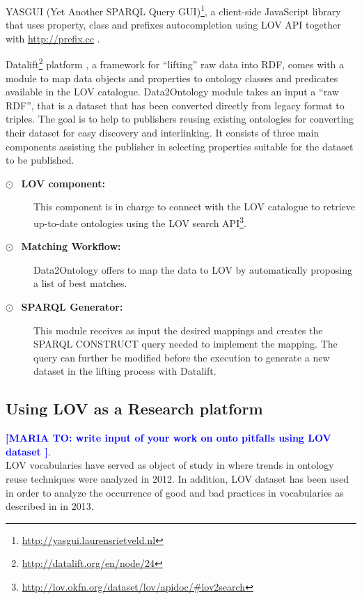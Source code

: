 \documentclass{iosart2c}
\newcommand{\maria}[1]{\textcolor{blue}{\textbf{[MARIA TO:#1]}}}
\begin{document}
YASGUI (Yet Another SPARQL Query GUI)\footnote{\url{http://yasgui.laurensrietveld.nl}}, a client-side JavaScript library that uses property, class and prefixes autocompletion using LOV API together with \url{http://prefix.cc} \cite{yasgui}.

Datalift\footnote{\url{http://datalift.org/en/node/24}} platform \cite{scharffe_2012}, a framework for ``lifting'' raw data into RDF, comes with a module to map data objects and properties to ontology classes and predicates available in the LOV catalogue. Data2Ontology module takes an input a ``raw RDF'', that is a dataset that has been converted directly from legacy format to triples. The goal is to help to publishers reusing existing ontologies for converting their dataset for easy discovery and interlinking. It consists of three main components assisting the publisher in selecting properties suitable for the dataset to be published. 
\begin{description}
\item[$\odot$~ \textbf{LOV component:}] This component is in charge to connect with the LOV catalogue to retrieve up-to-date ontologies using the LOV search API\footnote{\url{http://lov.okfn.org/dataset/lov/apidoc/\#lov2search}}.
\item[$\odot$~ \textbf{Matching Workflow:}] Data2Ontology offers to map the data to LOV by automatically proposing a list of best matches.

 \item[$\odot$~ \textbf{SPARQL Generator:}] This module receives as input the desired mappings and creates the SPARQL CONSTRUCT query needed to implement the mapping. The query can further be modified before the execution to generate a new dataset in the lifting process with Datalift.
 \end{description}

\subsection{Using LOV as a Research platform}
\maria{ write input of your work on onto pitfalls using LOV dataset }. \\

LOV vocabularies have served as object of study in \cite{poveda2012landscape} where trends in ontology reuse techniques were analyzed in 2012. In addition, LOV dataset has been used in order to analyze the occurrence of good and bad practices in vocabularies as described in \cite{poveda2013detecting} in 2013.
\end{document}
